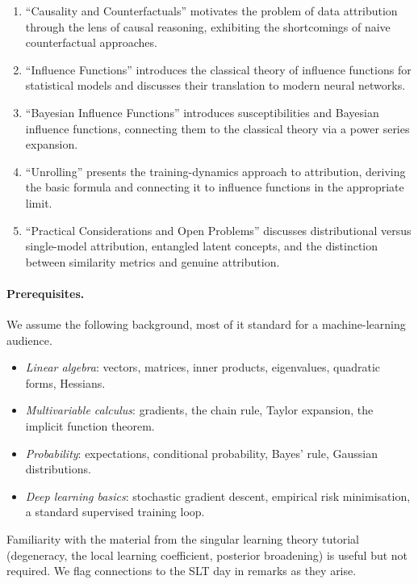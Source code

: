 \documentclass[11pt]{article}
\begin{document}
\begin{enumerate}[label=\arabic*.]
  \item ``Causality and Counterfactuals'' motivates the problem of data attribution through the lens of causal reasoning, exhibiting the shortcomings of naive counterfactual approaches.
  \item ``Influence Functions'' introduces the classical theory of influence functions for statistical models and discusses their translation to modern neural networks.
  \item ``Bayesian Influence Functions'' introduces susceptibilities and Bayesian influence functions, connecting them to the classical theory via a power series expansion.
  \item ``Unrolling'' presents the training-dynamics approach to attribution, deriving the basic formula and connecting it to influence functions in the appropriate limit.
  \item ``Practical Considerations and Open Problems'' discusses distributional versus single-model attribution, entangled latent concepts, and the distinction between similarity metrics and genuine attribution.
\end{enumerate}

\paragraph{Prerequisites.} We assume the following background, most of it standard for a machine-learning audience.
\begin{itemize}
  \item \emph{Linear algebra}: vectors, matrices, inner products, eigenvalues, quadratic forms, Hessians.
  \item \emph{Multivariable calculus}: gradients, the chain rule, Taylor expansion, the implicit function theorem.
  \item \emph{Probability}: expectations, conditional probability, Bayes' rule, Gaussian distributions.
  \item \emph{Deep learning basics}: stochastic gradient descent, empirical risk minimisation, a standard supervised training loop.
\end{itemize}
Familiarity with the material from the singular learning theory tutorial (degeneracy, the local learning coefficient, posterior broadening) is useful but not required. We flag connections to the SLT day in remarks as they arise.
\end{document}
